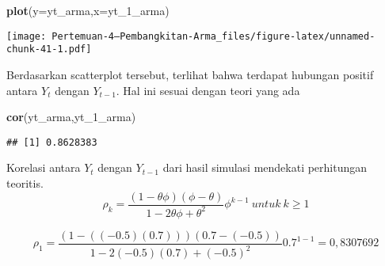 \documentclass[
]{article}
\newenvironment{Shaded}{\begin{snugshade}}{\end{snugshade}}
\newcommand{\AttributeTok}[1]{\textcolor[rgb]{0.13,0.29,0.53}{#1}}
\newcommand{\FunctionTok}[1]{\textcolor[rgb]{0.13,0.29,0.53}{\textbf{#1}}}
\newcommand{\NormalTok}[1]{#1}
\begin{document}
\begin{Shaded}
\begin{Highlighting}[]
\FunctionTok{plot}\NormalTok{(}\AttributeTok{y=}\NormalTok{yt\_arma,}\AttributeTok{x=}\NormalTok{yt\_1\_arma)}
\end{Highlighting}
\end{Shaded}

\texttt{[image: Pertemuan-4---Pembangkitan-Arma\_files/figure-latex/unnamed-chunk-41-1.pdf]}

Berdasarkan scatterplot tersebut, terlihat bahwa terdapat hubungan
positif antara \(Y_t\) dengan \(Y_{t-1}\). Hal ini sesuai dengan teori
yang ada

\begin{Shaded}
\begin{Highlighting}[]
\FunctionTok{cor}\NormalTok{(yt\_arma,yt\_1\_arma)}
\end{Highlighting}
\end{Shaded}

\begin{verbatim}
## [1] 0.8628383
\end{verbatim}

Korelasi antara \(Y_t\) dengan \(Y_{t-1}\) dari hasil simulasi mendekati
perhitungan teoritis. \[
\rho_k = \frac{(1-\theta \phi)(\phi-\theta)}{1-2\theta\phi+\theta^2}\phi^{k-1} \:untuk \:k\ge1
\]

\[
\rho_1 = \frac{(1-((-0.5)(0.7)))(0.7-(-0.5))}{1-2(-0.5)(0.7)+(-0.5)^2}0.7^{1-1}=0,8307692 \]
\end{document}
